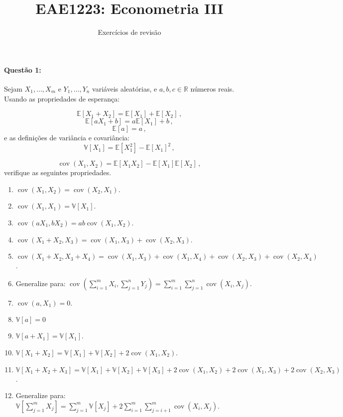 \documentclass[10pt,a4paper]{article}
\title{\large EAE1223: Econometria III}
\author{\normalsize Exercícios de revisão}
\date{}
\begin{document}
	\maketitle
	\paragraph{Questão 1:} Sejam $X_1,\ldots,X_m$ e $Y_1,\ldots, Y_n$ variáveis aleatórias, e $a,b,c \in \mathbb{R}$ números reais. Usando as propriedades de esperança:
	
	$$\mathbb{E}[X_1 + X_2] = \mathbb{E}[X_1] + \mathbb{E}[X_2] \, ,$$
	$$\mathbb{E}[aX_1 + b] = a\mathbb{E}[X_1] + b \, ,$$
	$$\mathbb{E}[a] = a \, ,$$
	e as definições de variância e covariância:
		$$\mathbb{V}[X_1] = \mathbb{E}[X_1^2] - \mathbb{E}[X_1]^2\,,$$

$$\operatorname{cov}(X_1,X_2) = \mathbb{E}[X_1X_2] - \mathbb{E}[X_1]\mathbb{E}[X_2]\,,$$
verifique as seguintes propriedades.

\begin{enumerate}
	\item $\operatorname{cov}(X_1,X_2) = \operatorname{cov}(X_2,X_1)$.
	\item $\operatorname{cov}(X_1,X_1) =  \mathbb{V}[X_1]$.
	\item $\operatorname{cov}(aX_1,bX_2) =  ab\operatorname{cov}(X_1,X_2)$.
	\item $\operatorname{cov}(X_1 + X_2,X_3) =  \operatorname{cov}(X_1,X_3) + \operatorname{cov}(X_2,X_3)$.
	\item $\operatorname{cov}(X_1 + X_2,X_3 + X_4) = \operatorname{cov}(X_1,X_3) + \operatorname{cov}(X_1,X_4) + \operatorname{cov}(X_2,X_3) + \operatorname{cov}(X_2,X_4)$.
	\item Generalize para: $\operatorname{cov}(\sum_{i=1}^mX_i,\sum_{j=1}^n Y_j) = \sum_{i=1}^{m}\sum_{j=1}^{n} \operatorname{cov}(X_i,X_j)$. 
	\item $\operatorname{cov}(a,X_1) = 0$.
	\item $\mathbb{V}[a] = 0$
	\item $\mathbb{V}[a + X_1] = \mathbb{V}[X_1]$.
	\item $\mathbb{V}[X_1 + X_2] = \mathbb{V}[X_1] + \mathbb{V}[X_2] + 2 \operatorname{cov}(X_1,X_2)$.
	\item $\mathbb{V}[X_1 + X_2 + X_3] = \mathbb{V}[X_1] + \mathbb{V}[X_2] +  \mathbb{V}[X_3]+ 2 \operatorname{cov}(X_1,X_2) + 2 \operatorname{cov}(X_1,X_3) + 2 \operatorname{cov}(X_2,X_3)$.
	\item Generalize para: $\mathbb{V}[\sum_{j=1}^{m}X_j] = \sum_{j=1}^m \mathbb{V}[X_j] + 2\sum_{i=1}^m \sum_{j=i+1}^m \operatorname{cov}(X_i,X_j)$.

\end{enumerate}
\end{document}
